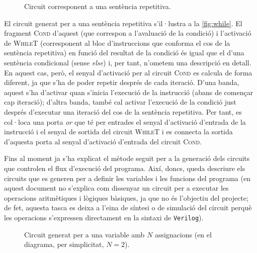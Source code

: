 \begin{figure}[ht]
    \centering
    
    \caption{Circuit corresponent a una sentència repetitiva.}
    \label{fig:while}
\end{figure}

El circuit generat per a una sentència repetitiva s'il·lustra a la 
\autoref{fig:while}. El fragment \textsc{Cond} d'aquest (que correspon a 
l'avaluació de la condició) i l'activació de \textsc{WhileT} (corresponent al 
bloc d'instruccions que conforma el cos de la sentència repetitiva) en funció 
del resultat de la condició és igual que el d'una sentència condicional
(sense \textit{else}) i, per tant, n'ometem una descripció en detall. En 
aquest cas, però, el senyal d'activació per al circuit \textsc{Cond} es 
calcula de forma diferent, ja que s'ha de poder repetir després de cada 
iteració. D'una banda, aquest s'ha d'activar quan s'inicia l'execució de la 
instrucció (abans de començar cap iteració); d'altra banda, també cal activar 
l'execució de la condició just després d'executar una iteració del cos de la 
sentència repetitiva. Per tant, es col·loca una porta \textit{or} que té per 
entrades el senyal d'activació d'entrada de la instrucció i el senyal de 
sortida del circuit \textsc{WhileT} i es connecta la sortida d'aquesta porta 
al senyal d'activació d'entrada del circuit \textsc{Cond}.  

Fins al moment ja s'ha explicat el mètode seguit per a la generació dels 
circuits que controlen el flux d'execució del programa. Així, doncs, queda 
descriure els circuits que es generen per a definir les variables i les 
funcions del programa (en aquest document no s'explica com dissenyar un 
circuit per a executar les operacions aritmètiques i lògiques bàsiques, ja 
que no és l'objectiu del projecte; de fet, aquesta tasca es deixa a l'eina de 
síntesi o de simulació del circuit perquè les operacions s'expressen 
directament en la sintaxi de \texttt{Verilog}).

\begin{figure}[ht]
    \centering
    
    \caption{Circuit generat per a una variable amb \(N\) assignacions 
        (en el diagrama, per simplicitat, \(N=2\)).}
    \label{fig:assign}
\end{figure}

